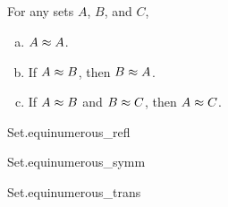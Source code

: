 \documentclass{report}
\begin{document}
\subsection{}%

  \begin{theorem}[6A]
    For any sets $A$, $B$, and $C$,
      \begin{enumerate}[(a)]
        \item $A \approx A$.
        \item If $A \approx B$, then $B \approx A$.
        \item If $A \approx B$ and $B \approx C$, then
          $A \approx C$.
      \end{enumerate}
  \end{theorem}

    {Set.equinumerous\_refl}

    {Set.equinumerous\_symm}

    {Set.equinumerous\_trans}
\end{document}
